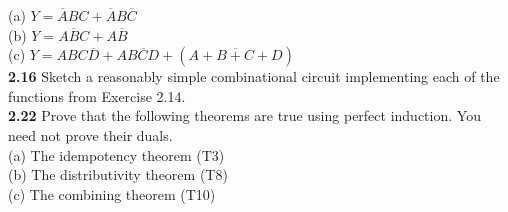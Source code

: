 \documentclass[12pt,a4paper]{report}
\begin{document}
\begin{normalsize}
(a) $ Y = \overline{A}BC + \overline{A}B\overline{C} $ \\


(b) $ Y = \overline{ABC} + A\overline{B} $ \\

(c) $ Y = ABC\overline{D} + A\overline{BCD} + (\overline{A + B + C + D}) $ \\

\textbf{2.16} Sketch a reasonably simple combinational circuit implementing each of the functions from Exercise 2.14.\\

\textbf{2.22} Prove that the following theorems are true using perfect induction. You need not prove their duals.\\

(a) The idempotency theorem (T3) \\

(b) The distributivity theorem (T8) \\

(c) The combining theorem (T10) \\

\end{normalsize}
\end{document}
